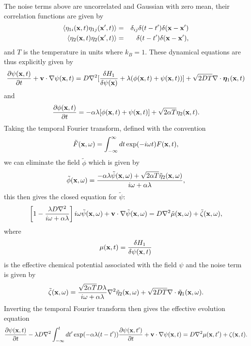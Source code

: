 The noise terms above 
are uncorrelated and Gaussian with zero mean, their correlation functions are given by
\begin{eqnarray}
\langle \eta_{1i}({\bf x},t) \eta_{1j}({\bf x}',t)\rangle&=& \delta_{ij}\delta(t-t') \delta({\bf x}-{\bf x}') \\
\langle \eta_{2}({\bf x},t) \eta_{2}({\bf x}',t)\rangle&=& \delta(t-t') \delta({\bf x}-{\bf x}') ,
\end{eqnarray}
and $T$ is the temperature in units where $k_B=1$.
These dynamical equations  are thus explicitly given by
\begin{equation}
\frac{\partial \psi({\bf x},t)}{\partial t} +{\bf v}\cdot { \nabla}\psi({\bf x},t)= D\nabla^2[\frac{\delta H_1}{\delta \psi({\bf x})}+\lambda(\phi({\bf x},t) + \psi({\bf x},t))]+ \sqrt{2D T}\nabla \cdot {\boldsymbol \eta}_1({\bf x},t)
\end{equation}
and
\begin{equation}
\frac{\partial \phi({\bf x},t)}{\partial t} = -\alpha\lambda[\phi({\bf x},t) + \psi({\bf x},t)]+ \sqrt{2\alpha T}{ \eta}_2({\bf x},t).
\end{equation}
Taking the temporal Fourier transform, defined with the convention
\begin{equation}
\tilde F({\bf x}, \omega) = \int_{-\infty}^\infty dt \exp(-i\omega t)F({\bf x}, t),
\end{equation}
we can eliminate the field $\tilde \phi$ which is given by
\begin{equation}
\tilde \phi({\bf x},\omega) = \frac{-\alpha\lambda \tilde \psi({\bf x},\omega)+\sqrt{2\alpha T}\tilde \eta_2({\bf x},\omega)}{i\omega +\alpha \lambda},
\end{equation}
this then gives the closed equation for $\tilde \psi$:
\begin{equation}
\left[1-\frac{\lambda D \nabla^2}{i\omega+\alpha\lambda}\right]i\omega \tilde\psi({\bf x}, \omega) +{\bf v}\cdot\nabla\tilde\psi({\bf x}, \omega)
= D\nabla^2 \tilde \mu({\bf x},\omega) +  \tilde \zeta({\bf x},\omega),
\end{equation}
where 
\begin{equation}
\mu({\bf x},t)=\frac{\delta H_1}{\delta \psi({\bf x},t)}
\end{equation}
is the effective chemical potential associated with the field $\psi$ and the noise term is given by
\begin{equation}
\tilde \zeta({\bf x},\omega) = \frac{\sqrt{2\alpha T}D\lambda}{i\omega + \alpha\lambda}\nabla^2\tilde \eta_2({\bf x},\omega) +
\sqrt{2DT}\nabla\cdot\tilde {\bm \eta}_1({\bf x},\omega).
\end{equation}
Inverting the temporal Fourier transform then gives the effective evolution equation
\begin{equation}
\frac{\partial \psi({\bf x},t)}{\partial t} -\lambda D\nabla^2\int_{-\infty}^t dt'
\exp(-\alpha\lambda(t-t')) \frac{\partial \psi({\bf x},t')}{\partial t}+{\bf v}\cdot\nabla\psi({\bf x}, t)=D\nabla^2  \mu({\bf x},t') +  \zeta({\bf x},t).\label{dyn1}
\end{equation}
